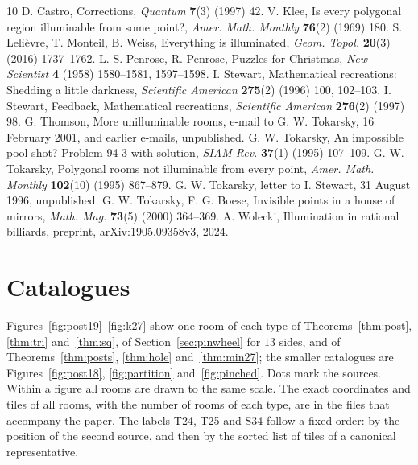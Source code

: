 \documentclass[11pt,a4paper]{article}
\theoremstyle{plain}
\theoremstyle{definition}
\theoremstyle{remark}
\numberwithin{equation}{section}
\begin{document}
\begin{thebibliography}{10}\frenchspacing
{} D. Castro, Corrections, \emph{Quantum} \textbf{7}(3) (1997) 42.
 V. Klee, Is every polygonal region illuminable from some point?, \emph{Amer. Math. Monthly} \textbf{76}(2) (1969) 180.
 S. Leli\`evre, T. Monteil, B. Weiss, Everything is illuminated, \emph{Geom. Topol.} \textbf{20}(3) (2016) 1737--1762.
 L. S. Penrose, R. Penrose, Puzzles for Christmas, \emph{New Scientist} \textbf{4} (1958) 1580--1581, 1597--1598.
 I. Stewart, Mathematical recreations: Shedding a little darkness, \emph{Scientific American} \textbf{275}(2) (1996) 100, 102--103.
 I. Stewart, Feedback, Mathematical recreations, \emph{Scientific American} \textbf{276}(2) (1997) 98.
 G. Thomson, More unilluminable rooms, e-mail to G. W. Tokarsky, 16 February 2001, and earlier e-mails, unpublished.
 G. W. Tokarsky, An impossible pool shot? Problem 94-3 with solution, \emph{SIAM Rev.} \textbf{37}(1) (1995) 107--109.
 G. W. Tokarsky, Polygonal rooms not illuminable from every point, \emph{Amer. Math. Monthly} \textbf{102}(10) (1995) 867--879.
 G. W. Tokarsky, letter to I. Stewart, 31 August 1996, unpublished.
 G. W. Tokarsky, F. G. Boese, Invisible points in a house of mirrors, \emph{Math. Mag.} \textbf{73}(5) (2000) 364--369.
 A. Wolecki, Illumination in rational billiards, preprint, arXiv:1905.09358v3, 2024.
\end{thebibliography}

\appendix

\clearpage
\section{Catalogues}\label{app:plates}

Figures~\ref{fig:post19}--\ref{fig:k27} show one room of each type of Theorems~\ref{thm:post}, \ref{thm:tri} and~\ref{thm:sq}, of Section~\ref{sec:pinwheel} for $13$ sides, and of Theorems~\ref{thm:posts}, \ref{thm:hole} and~\ref{thm:min27}; the smaller catalogues are Figures~\ref{fig:post18}, \ref{fig:partition} and~\ref{fig:pinched}. Dots mark the sources. Within a figure all rooms are drawn to the same scale. The exact coordinates and tiles of all rooms, with the number of rooms of each type, are in the files that accompany the paper. The labels T24, T25 and S34 follow a fixed order: by the position of the second source, and then by the sorted list of tiles of a canonical representative.
\end{document}

